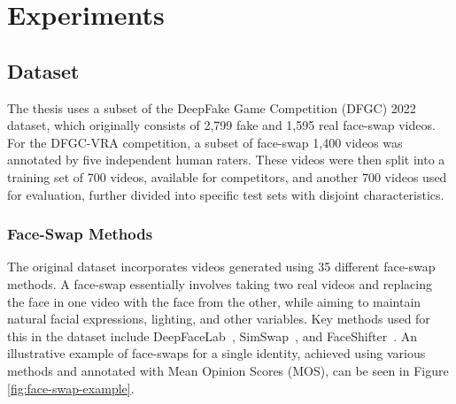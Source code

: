 \documentclass[a4paper,12pt,openright]{book}
\begin{document}
\chapter{Experiments}
\label{chap:experiments}
\section{Dataset}

The thesis uses a subset of the DeepFake Game Competition (DFGC) 2022 dataset, which originally consists of 2,799 fake and 1,595 real face-swap videos. For the DFGC-VRA competition, a subset of face-swap 1,400 videos was annotated by five independent human raters. These videos were then split into a training set of 700 videos, available for competitors, and another 700 videos used for evaluation, further divided into specific test sets with disjoint characteristics.

\subsection{Face-Swap Methods}

The original dataset incorporates videos generated using 35 different face-swap methods. A face-swap essentially involves taking two real videos and replacing the face in one video with the face from the other, while aiming to maintain natural facial expressions, lighting, and other variables. Key methods used for this in the dataset include DeepFaceLab~\cite{DBLP:journals/corr/abs-2005-05535}, SimSwap~\cite{DBLP:journals/corr/abs-2106-06340}, and FaceShifter~\cite{DBLP:journals/corr/abs-1912-13457}. An illustrative example of face-swaps for a single identity, achieved using various methods and annotated with Mean Opinion Scores (MOS), can be seen in Figure \ref{fig:face-swap-example}.
\end{document}

